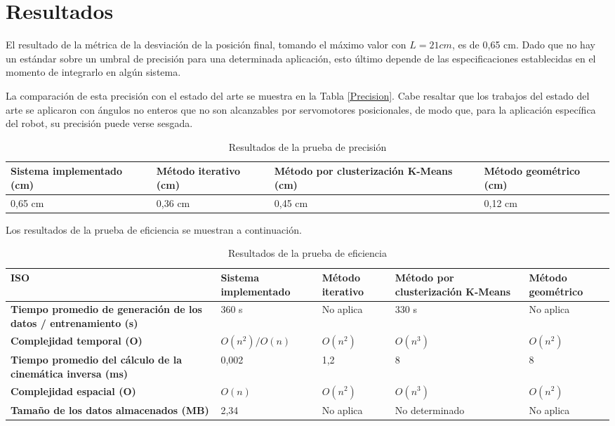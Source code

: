 \section{Resultados}

El resultado de la métrica de la desviación de la posición final, tomando el máximo valor con $L = 21 cm$, es de 0,65 cm. Dado que no hay un estándar sobre un umbral de precisión para una determinada aplicación, esto último depende de las especificaciones establecidas en el momento de integrarlo en algún sistema.

La comparación de esta precisión con el estado del arte se muestra en la Tabla \ref{Precision}. Cabe resaltar que los trabajos del estado del arte se aplicaron con ángulos no enteros que no son alcanzables por servomotores posicionales, de modo que, para la aplicación específica del robot, su precisión puede verse sesgada.

\begin{table}[ht]
	\centering
	\begin{tabular}{p{5cm}p{4cm}p{3.6cm}p{4cm}}
		\hline
		\textbf{Sistema implementado (cm)} & \textbf{Método iterativo (cm)} & \textbf{Método por clusterización K-Means (cm)} & \textbf{Método geométrico (cm)} \\
		\hline
		0,65 cm & 0,36 cm & 0,45 cm & 0,12 cm \\
		\hline
	\end{tabular}
	\caption{Resultados de la prueba de precisión}
	\label{tab:Precision}
\end{table}

Los resultados de la prueba de eficiencia se muestran a continuación.

\begin{table}[ht]
	\centering
	\begin{tabular}{p{3.2cm}p{3.2cm}p{3.2cm}p{3.2cm}p{3.2cm}}
		\hline
	    \textbf{ISO} & \textbf{Sistema implementado} & \textbf{Método iterativo} & \textbf{Método por clusterización K-Means} & \textbf{Método geométrico} \\
		\hline
		\textbf{Tiempo promedio de generación de los datos / entrenamiento (s)} & 360 s & No aplica & 330 s & No aplica \\
		\textbf{Complejidad temporal (O)} & $O(n^2)/O(n)$ & $O(n^2)$ & $O(n^3)$ & $O(n^2)$ \\
		\textbf{Tiempo promedio del cálculo de la cinemática inversa (ms)} & 0,002 & 1,2 & 8 & 8 \\
		\textbf{Complejidad espacial (O)} & $O(n)$ & $O(n^2)$ & $O(n^3)$ & $O(n^2)$ \\
		\textbf{Tamaño de los datos almacenados (MB)} & 2,34 & No aplica & No determinado & No aplica \\
		\hline
	\end{tabular}
	\caption{Resultados de la prueba de eficiencia}
	\label{tab:Precision}
\end{table}
